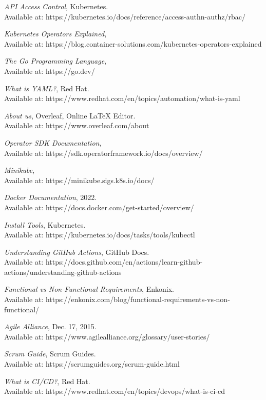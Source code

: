 \documentclass{article}
\begin{document}
\begin{thebibliography}{9}
\emph{API Access Control}, Kubernetes. \\ Available at: https://kubernetes.io/docs/reference/access-authn-authz/rbac/  

\emph{Kubernetes Operators Explained}, \\Available at: https://blog.container-solutions.com/kubernetes-operators-explained
  
\emph{The Go Programming Language}, \\Available at: https://go.dev/

\emph{What is YAML?}, Red Hat. \\Available at: https://www.redhat.com/en/topics/automation/what-is-yaml

\emph{About us}, Overleaf, Online LaTeX Editor. \\Available at: https://www.overleaf.com/about 

\emph{Operator SDK Documentation},\\ Available at: https://sdk.operatorframework.io/docs/overview/

\emph{Minikube}, \\Available at: https://minikube.sigs.k8s.io/docs/

\emph{Docker Documentation}, 2022. \\Available at: https://docs.docker.com/get-started/overview/
  
\emph{Install Tools}, Kubernetes. \\Available at: https://kubernetes.io/docs/tasks/tools/kubectl

\emph{Understanding GitHub Actions}, GitHub Docs. \\Available at: https://docs.github.com/en/actions/learn-github-actions/understanding-github-actions

\emph{Functional vs Non-Functional Requirements}, Enkonix. \\Available at: https://enkonix.com/blog/functional-requirements-vs-non-functional/

\emph{Agile Alliance}, Dec. 17, 2015. \\Available at: https://www.agilealliance.org/glossary/user-stories/
  
\emph{Scrum Guide}, Scrum Guides. \\Available at: https://scrumguides.org/scrum-guide.html
  
\emph{What is CI/CD?}, Red Hat. \\Available at: https://www.redhat.com/en/topics/devops/what-is-ci-cd

\end{thebibliography}
\end{document}
